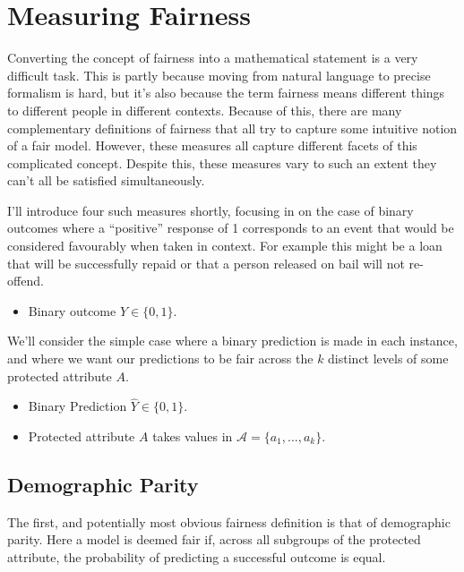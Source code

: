 \documentclass[
  12pt,
]{book}
\providecommand{\tightlist}{%
  \setlength{\itemsep}{0pt}\setlength{\parskip}{0pt}}
\begin{document}
\hypertarget{measuring-fairness}{%
\section{Measuring Fairness}\label{measuring-fairness}}

Converting the concept of fairness into a mathematical statement is a very difficult task. This is partly because moving from natural language to precise formalism is hard, but it's also because the term fairness means different things to different people in different contexts. Because of this, there are many complementary definitions of fairness that all try to capture some intuitive notion of a fair model. However, these measures all capture different facets of this complicated concept. Despite this, these measures vary to such an extent they can't all be satisfied simultaneously.

I'll introduce four such measures shortly, focusing in on the case of binary outcomes where a ``positive'' response of 1 corresponds to an event that would be considered favourably when taken in context. For example this might be a loan that will be successfully repaid or that a person released on bail will not re-offend.

\begin{itemize}
\tightlist
\item
  Binary outcome \(Y \in \{0,1\}\).
\end{itemize}

We'll consider the simple case where a binary prediction is made in each instance, and where we want our predictions to be fair across the \(k\) distinct levels of some protected attribute \(A\).

\begin{itemize}
\tightlist
\item
  Binary Prediction \(\hat Y \in \{0,1\}\).
\item
  Protected attribute \(A\) takes values in \(\mathcal{A} = \{a_1, \ldots, a_k\}\).
\end{itemize}

\hypertarget{demographic-parity}{%
\subsection{Demographic Parity}\label{demographic-parity}}

The first, and potentially most obvious fairness definition is that of demographic parity. Here a model is deemed fair if, across all subgroups of the protected attribute, the probability of predicting a successful outcome is equal.
\end{document}
